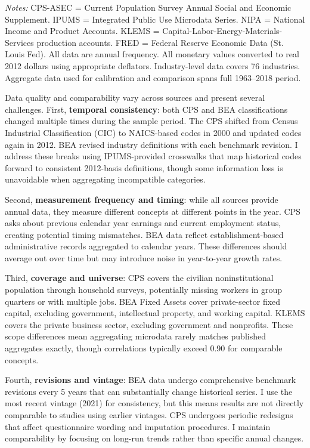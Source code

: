 \documentclass[12pt]{article}
\begin{document}
\begin{table}[h]
\vspace{0.5em}
\begin{minipage}{\textwidth}
\small
\textit{Notes:} CPS-ASEC = Current Population Survey Annual Social and Economic Supplement. IPUMS = Integrated Public Use Microdata Series. NIPA = National Income and Product Accounts. KLEMS = Capital-Labor-Energy-Materials-Services production accounts. FRED = Federal Reserve Economic Data (St. Louis Fed). All data are annual frequency. All monetary values converted to real 2012 dollars using appropriate deflators. Industry-level data covers 76 industries. Aggregate data used for calibration and comparison spans full 1963--2018 period.
\end{minipage}
\end{table}

Data quality and comparability vary across sources and present several challenges. First, \textbf{temporal consistency}: both CPS and BEA classifications changed multiple times during the sample period. The CPS shifted from Census Industrial Classification (CIC) to NAICS-based codes in 2000 and updated codes again in 2012. BEA revised industry definitions with each benchmark revision. I address these breaks using IPUMS-provided crosswalks that map historical codes forward to consistent 2012-basis definitions, though some information loss is unavoidable when aggregating incompatible categories.

Second, \textbf{measurement frequency and timing}: while all sources provide annual data, they measure different concepts at different points in the year. CPS asks about previous calendar year earnings and current employment status, creating potential timing mismatches. BEA data reflect establishment-based administrative records aggregated to calendar years. These differences should average out over time but may introduce noise in year-to-year growth rates.

Third, \textbf{coverage and universe}: CPS covers the civilian noninstitutional population through household surveys, potentially missing workers in group quarters or with multiple jobs. BEA Fixed Assets cover private-sector fixed capital, excluding government, intellectual property, and working capital. KLEMS covers the private business sector, excluding government and nonprofits. These scope differences mean aggregating microdata rarely matches published aggregates exactly, though correlations typically exceed 0.90 for comparable concepts.

Fourth, \textbf{revisions and vintage}: BEA data undergo comprehensive benchmark revisions every 5 years that can substantially change historical series. I use the most recent vintage (2021) for consistency, but this means results are not directly comparable to studies using earlier vintages. CPS undergoes periodic redesigns that affect questionnaire wording and imputation procedures. I maintain comparability by focusing on long-run trends rather than specific annual changes.
\end{document}
